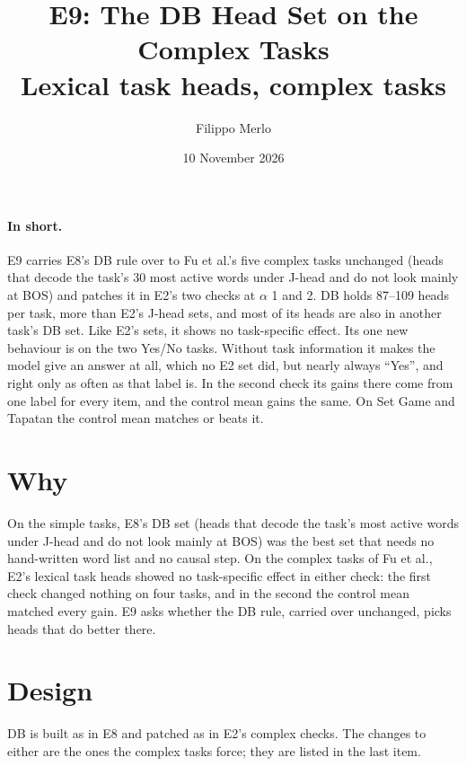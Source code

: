 \documentclass[10pt,a4paper]{article}
\title{E9: The DB Head Set on the Complex Tasks\\\large Lexical task heads, complex tasks}
\author{Filippo Merlo}
\date{10 November 2026}
\begin{document}
\maketitle
\vspace{-1.5em}

\paragraph{In short.} E9 carries E8's DB rule over to Fu et al.'s five complex tasks unchanged (heads that decode the task's 30 most active words under J-head and do not look mainly at BOS) and patches it in E2's two checks at $\alpha$ 1 and 2. DB holds 87--109 heads per task, more than E2's J-head sets, and most of its heads are also in another task's DB set. Like E2's sets, it shows no task-specific effect. Its one new behaviour is on the two Yes/No tasks. Without task information it makes the model give an answer at all, which no E2 set did, but nearly always ``Yes'', and right only as often as that label is. In the second check its gains there come from one label for every item, and the control mean gains the same. On Set Game and Tapatan the control mean matches or beats it.

\section{Why}

On the simple tasks, E8's DB set (heads that decode the task's most active words under J-head and do not look mainly at BOS) was the best set that needs no hand-written word list and no causal step. On the complex tasks of Fu et al., E2's lexical task heads showed no task-specific effect in either check: the first check changed nothing on four tasks, and in the second the control mean matched every gain. E9 asks whether the DB rule, carried over unchanged, picks heads that do better there.

\section{Design}

DB is built as in E8 and patched as in E2's complex checks. The changes to either are the ones the complex tasks force; they are listed in the last item.
\end{document}
